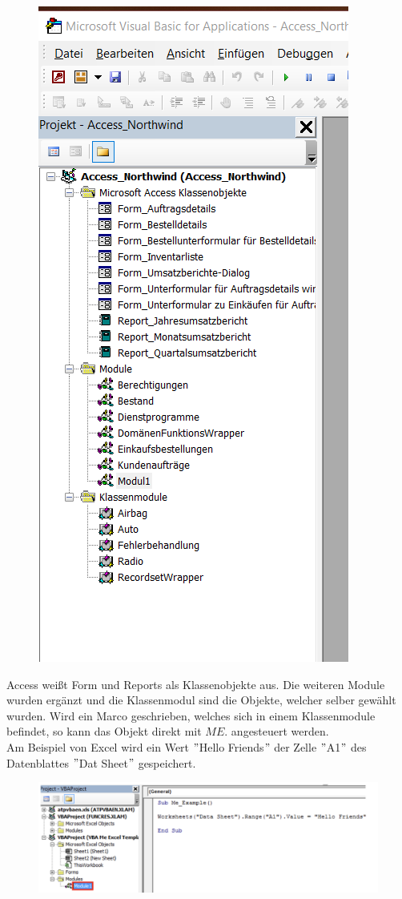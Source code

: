\begin{figure}[H]
	\centering
	\includegraphics[scale = 0.3]{attachment/chapter_2/Scc053}
	\caption{}
	\label{fig:Scc053}
\end{figure} 
Access weißt Form und Reports als Klassenobjekte aus. Die weiteren Module wurden ergänzt und die Klassenmodul sind die Objekte, welcher selber gewählt wurden.
Wird ein Marco geschrieben, welches sich in einem Klassenmodule befindet, so kann das Objekt direkt mit $ME.$ angesteuert werden. \\
Am Beispiel von Excel wird ein Wert $"$Hello Friends$"$ der Zelle $"$A1$"$ des Datenblattes $"$Dat Sheet$"$ gespeichert. 
\begin{figure}[H]
	\centering
	\includegraphics[scale = 0.3]{attachment/chapter_2/Scc054}
	\caption{}
	\label{fig:Scc054}
\end{figure}
